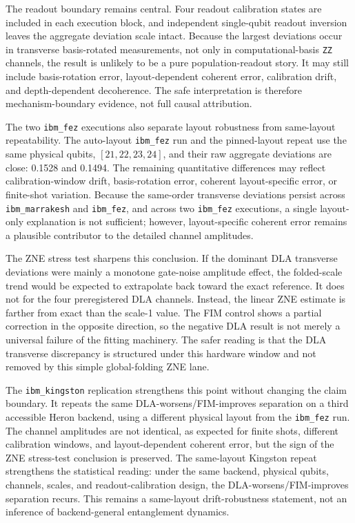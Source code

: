 \documentclass[preprint,aps,physrev,superscriptaddress,floatfix,longbibliography]{revtex4-2}
\begin{document}
The readout boundary remains central. Four readout calibration states are
included in each execution block, and independent single-qubit readout
inversion leaves the aggregate deviation scale intact. Because the largest
deviations occur in transverse basis-rotated measurements, not only in
computational-basis \texttt{ZZ} channels, the result is unlikely to be a pure
population-readout story. It may still include basis-rotation error,
layout-dependent coherent error, calibration drift, and depth-dependent
decoherence. The safe interpretation is therefore mechanism-boundary evidence,
not full causal attribution.

The two \texttt{ibm\_fez} executions also separate layout robustness from
same-layout repeatability. The auto-layout \texttt{ibm\_fez} run and the
pinned-layout repeat use the same physical qubits, $[21,22,23,24]$, and their
raw aggregate deviations are close: 0.1528 and 0.1494. The remaining
quantitative differences may reflect calibration-window drift, basis-rotation
error, coherent layout-specific error, or finite-shot variation. Because the
same-order transverse deviations persist across \texttt{ibm\_marrakesh} and
\texttt{ibm\_fez}, and across two \texttt{ibm\_fez} executions, a single
layout-only explanation is not sufficient; however, layout-specific coherent
error remains a plausible contributor to the detailed channel amplitudes.

The ZNE stress test sharpens this conclusion. If the dominant DLA transverse
deviations were mainly a monotone gate-noise amplitude effect, the folded-scale
trend would be expected to extrapolate back toward the exact reference. It
does not for the four preregistered DLA channels. Instead, the linear ZNE
estimate is farther from exact than the scale-1 value. The FIM control shows a
partial correction in the opposite direction, so the negative DLA result is
not merely a universal failure of the fitting machinery. The safer reading is
that the DLA transverse discrepancy is structured under this hardware window
and not removed by this simple global-folding ZNE lane.

The \texttt{ibm\_kingston} replication strengthens this point without changing
the claim boundary. It repeats the same DLA-worsens/FIM-improves separation on
a third accessible Heron backend, using a different physical layout from the
\texttt{ibm\_fez} run. The channel amplitudes are not identical, as expected
for finite shots, different calibration windows, and layout-dependent coherent
error, but the sign of the ZNE stress-test conclusion is preserved. The
same-layout Kingston repeat strengthens the statistical reading: under the
same backend, physical qubits, channels, scales, and readout-calibration
design, the DLA-worsens/FIM-improves separation recurs. This remains a
same-layout drift-robustness statement, not an inference of backend-general
entanglement dynamics.
\end{document}
